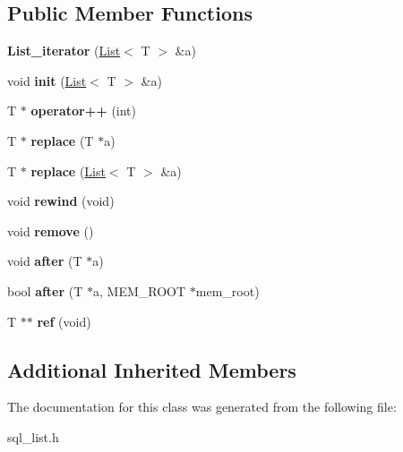 \subsection*{Public Member Functions}
\begin{DoxyCompactItemize}
\item 
\mbox{\label{classList__iterator_add26fccb87154d54c657c91218786692}} 
{\bfseries List\+\_\+iterator} (\mbox{\hyperlink{classList}{List}}$<$ T $>$ \&a)
\item 
\mbox{\label{classList__iterator_a115e18381cea9870e0ce20ec1de214ab}} 
void {\bfseries init} (\mbox{\hyperlink{classList}{List}}$<$ T $>$ \&a)
\item 
\mbox{\label{classList__iterator_a72deb69114f8d427fe1a0ec3737732a6}} 
T $\ast$ {\bfseries operator++} (int)
\item 
\mbox{\label{classList__iterator_a93047660a270d156391be21339314fa0}} 
T $\ast$ {\bfseries replace} (T $\ast$a)
\item 
\mbox{\label{classList__iterator_aa16bc3819f8345293dd25d85150c541e}} 
T $\ast$ {\bfseries replace} (\mbox{\hyperlink{classList}{List}}$<$ T $>$ \&a)
\item 
\mbox{\label{classList__iterator_ad46b94a974daa86591acecacabcb4fbe}} 
void {\bfseries rewind} (void)
\item 
\mbox{\label{classList__iterator_ac59dc0032b6cc6f56bb8d4bcbfdd8b6f}} 
void {\bfseries remove} ()
\item 
\mbox{\label{classList__iterator_a24a071886d672141f2d9484d482c697f}} 
void {\bfseries after} (T $\ast$a)
\item 
\mbox{\label{classList__iterator_aba7558697d5bfe89f556d7eae92343c0}} 
bool {\bfseries after} (T $\ast$a, M\+E\+M\+\_\+\+R\+O\+OT $\ast$mem\+\_\+root)
\item 
\mbox{\label{classList__iterator_a50f225a5eef310d3a9ca0ff97caeb5bc}} 
T $\ast$$\ast$ {\bfseries ref} (void)
\end{DoxyCompactItemize}
\subsection*{Additional Inherited Members}


The documentation for this class was generated from the following file\+:\begin{DoxyCompactItemize}
\item 
sql\+\_\+list.\+h\end{DoxyCompactItemize}
